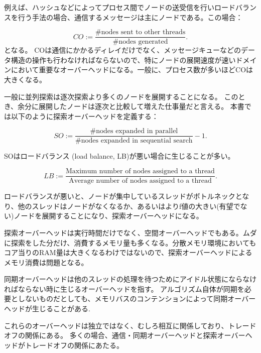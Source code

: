 例えば、ハッシュなどによってプロセス間でノードの送受信を行いロードバランスを行う手法の場合、通信するメッセージは主にノードである。この場合：

\begin{equation}
	CO := \frac{\text{\# nodes sent to other threads}}{\text{\# nodes generated}}.
\end{equation}
となる。
COは通信にかかるディレイだけでなく、メッセージキューなどのデータ構造の操作も行わなければならないので、特にノードの展開速度が速いドメインにおいて重要なオーバーヘッドになる。一般に、プロセス数が多いほどCOは大きくなる。


一般に並列探索は逐次探索より多くのノードを展開することになる。
このとき、余分に展開したノードは逐次と比較して増えた仕事量だと言える。
本書では以下のように探索オーバーヘッドを定義する：

\begin{equation}
SO := \frac{\text{\# nodes expanded in parallel}}{\text{\#nodes expanded in sequential search}} - 1.
\end{equation}

SOはロードバランス (load balance, LB)が悪い場合に生じることが多い。

\begin{equation}
LB := \frac{\text{Maximum number of nodes assigned to a thread}}{\text{Average number of nodes assigned to a thread}}.
\end{equation}

ロードバランスが悪いと、ノードが集中しているスレッドがボトルネックとなり、他のスレッドはノードがなくなるか、あるいはよりf値の大きい(有望でない)ノードを展開することになり、探索オーバーヘッドになる。

探索オーバーヘッドは実行時間だけでなく、空間オーバーヘッドでもある。ムダに探索をした分だけ、消費するメモリ量も多くなる。分散メモリ環境においてもコア当りのRAM量は大きくなるわけではないので、探索オーバーヘッドによるメモリ消費は問題となる。


同期オーバーヘッドは他のスレッドの処理を待つためにアイドル状態にならなければならない時に生じるオーバーヘッドを指す。
アルゴリズム自体が同期を必要としないものだとしても、メモリバスのコンテンションによって同期オーバーヘッドが生じることがある\cite{burnslrz10,kishimotofb13}.


これらのオーバーヘッドは独立ではなく、むしろ相互に関係しており、トレードオフの関係にある。
多くの場合、通信・同期オーバーヘッドと探索オーバーヘッドがトレードオフの関係にあたる。

